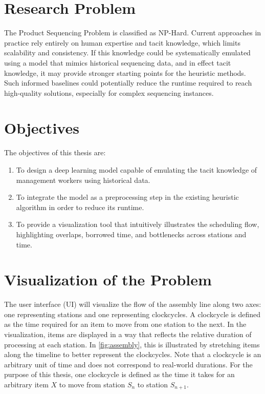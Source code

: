 \documentclass[12pt,a4paper]{report}
\begin{document}
\section{Research Problem}
The Product Sequencing Problem is classified as NP-Hard. Current approaches in practice rely entirely on human expertise and tacit knowledge, which limits scalability and consistency. If this knowledge could be systematically emulated using a model that mimics historical sequencing data, and in effect tacit knowledge, it may provide stronger starting points for the heuristic methods. Such informed baselines could potentially reduce the runtime required to reach high-quality solutions, especially for complex sequencing instances.

\section{Objectives}
The objectives of this thesis are:
\begin{enumerate}
    \item To design a deep learning model capable of emulating the tacit knowledge of management workers using historical data.
    \item To integrate the model as a preprocessing step in the existing heuristic algorithm in order to reduce its runtime.
    \item To provide a visualization tool that intuitively illustrates the scheduling flow, highlighting overlaps, borrowed time, and bottlenecks across stations and time.
\end{enumerate}

\section{Visualization of the Problem}

The user interface (UI) will visualize the flow of the assembly line along two axes: one representing stations and one representing clockcycles. A clockcycle is defined as the time required for an item to move from one station to the next. In the visualization, items are displayed in a way that reflects the relative duration of processing at each station. In \autoref{fig:assembly}, this is illustrated by stretching items along the timeline to better represent the clockcycles. Note that a clockcycle is an arbitrary unit of time and does not correspond to real-world durations. For the purpose of this thesis, one clockcycle is defined as the time it takes for an arbitrary item $X$ to move from station $S_n$ to station $S_{n+1}$.
\end{document}
